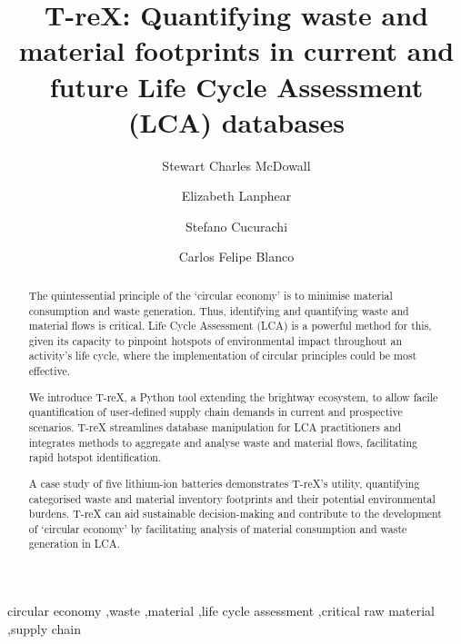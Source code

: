 \documentclass[review,3p,authoryear]{elsarticle}
\newcommand{\cbox}[1]{
    \begin{tcolorbox}[hbox, colback=red!5!white, colframe=red!65!black, boxrule=0.25pt, boxsep=2pt, left=2pt, right=2pt, top=1pt, bottom=1pt]
        \small\sffamily #1
    \end{tcolorbox}
    }
\begin{document}
\begin{frontmatter}

    \title{T-reX: Quantifying waste and material footprints in current and future Life Cycle Assessment (LCA) databases}
    \author[1]{Stewart Charles McDowall}
    \author[1]{Elizabeth Lanphear}
    \author[1]{Stefano Cucurachi}
    \author[1]{Carlos Felipe Blanco}



    \begin{abstract}
        The quintessential principle of the `circular economy' is to minimise material consumption and waste generation. Thus, identifying and quantifying waste and material flows is critical. Life Cycle Assessment (LCA) is a powerful method for this, given its capacity to pinpoint hotspots of environmental impact throughout an activity's life cycle, where the implementation of circular principles could be most effective.

        We introduce T-reX, a Python tool extending the brightway ecosystem, to allow facile quantification of user-defined supply chain demands in current and prospective scenarios. T-reX streamlines database manipulation for LCA practitioners and integrates methods to aggregate and analyse waste and material flows, facilitating rapid hotspot identification.

        A case study of five lithium-ion batteries demonstrates T-reX's utility, quantifying categorised waste and material inventory footprints and their potential environmental burdens. T-reX can aid sustainable decision-making and contribute to the development of `circular economy' by facilitating analysis of material consumption and waste generation in LCA.


    \end{abstract}

    \begin{keyword}
        circular economy \sep{}waste \sep{}material \sep{}life cycle assessment \sep{}critical raw material \sep{}supply chain
    \end{keyword}

\end{frontmatter}
\end{document}
